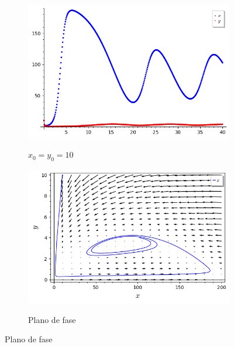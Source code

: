\begin{figure}[H]
    \centering
    \begin{subfigure}{0.4\textwidth}
        \includegraphics[scale=0.48]{figuras/HT_3.png}
        \label{fig:HT_3}
        \caption{$x_0 = y_0 = 10$}
    \end{subfigure}
    \begin{subfigure}{0.4\textwidth}
        \includegraphics[scale=0.48]{figuras/HT_4.png}
        \label{fig:HT_4}
        \caption{Plano de fase}
    \end{subfigure}
\end{figure}

